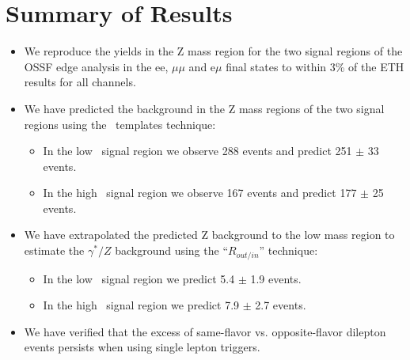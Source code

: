 \section{Summary of Results}

\begin{itemize}
\item We reproduce the yields in the Z mass region for the two signal regions of the OSSF edge analysis in the ee, 
$\mu\mu$ and e$\mu$ final states to within 3\% of the ETH results for all channels.
\item We have predicted the background in the Z mass regions of the two signal regions using the \MET\ templates technique:
\begin{itemize}
\item In the low \MET\ signal region we observe 288 events and predict 251 $\pm$ 33 events.
\item In the high \MET\ signal region we observe 167 events and predict 177 $\pm$ 25 events.
\end{itemize}
\item We have extrapolated the predicted Z background to the low mass region to estimate the $\gamma^*/Z$ background using the ``$R_{out/in}$'' technique:
\begin{itemize}
\item In the low \MET\ signal region we predict  5.4 $\pm$ 1.9 events.
\item In the high \MET\ signal region we predict  7.9 $\pm$ 2.7 events.
\end{itemize}
\item We have verified that the excess of same-flavor vs. opposite-flavor dilepton events persists when using single lepton triggers.
\end{itemize}
